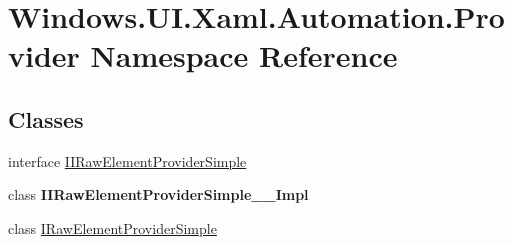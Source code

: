 \hypertarget{namespace_windows_1_1_u_i_1_1_xaml_1_1_automation_1_1_provider}{}\section{Windows.\+U\+I.\+Xaml.\+Automation.\+Provider Namespace Reference}
\label{namespace_windows_1_1_u_i_1_1_xaml_1_1_automation_1_1_provider}
\subsection*{Classes}
\begin{DoxyCompactItemize}
\item 
interface \hyperlink{interface_windows_1_1_u_i_1_1_xaml_1_1_automation_1_1_provider_1_1_i_i_raw_element_provider_simple}{I\+I\+Raw\+Element\+Provider\+Simple}
\item 
class {\bfseries I\+I\+Raw\+Element\+Provider\+Simple\+\_\+\+\_\+\+Impl}
\item 
class \hyperlink{class_windows_1_1_u_i_1_1_xaml_1_1_automation_1_1_provider_1_1_i_raw_element_provider_simple}{I\+Raw\+Element\+Provider\+Simple}
\end{DoxyCompactItemize}
